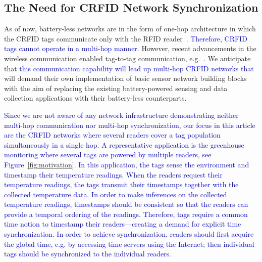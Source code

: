 \documentclass[10pt,journal,compsoc]{IEEEtran}
\newcommand{\add}[1]{\textcolor{blue}{#1}}
\begin{document}
\subsection{The Need for CRFID Network Synchronization}

As of now, battery-less networks are in the form of one-hop architecture in which the CRFID tags communicate only with the RFID reader~\cite{wisp,booksmith2013,wisent:2016}. \add{Therefore, CRFID tags cannot operate in a multi-hop manner.} However, recent advancements in the wireless communication enabled tag-to-tag communication, e.g.~\cite{liu2013ambient}.  We anticipate that \add{this communication capability will lead up multi-hop CRFID networks that} will demand their own implementation of basic sensor network building blocks~\cite{levis:tinyos} with the aim of replacing the existing battery-powered sensing and data collection applications with their battery-less counterparts. 

\add{Since we are not aware of any network infrastructure demonstrating neither multi-hop communication nor multi-hop synchronization, our focus in this article are the CRFID networks where several readers cover a tag population simultaneously in a single hop. A representative application is the greenhouse monitoring where several tags are powered by multiple readers, see Figure~\ref{fig:motivation}. In this application, the tags sense the environment and timestamp their temperature readings. When the readers request their temperature readings, the tags transmit their timestamps together with the collected temperature data. In order to make inferences on the collected temperature readings, timestamps should be consistent so that the readers can provide a temporal ordering of the readings. Therefore, tags require a common time notion to timestamp their readers---creating a demand for explicit time synchronization. In order to achieve synchronization, readers should first acquire the global time, e.g. by accessing time servers using the Internet; then individual tags should be synchronized to the individual readers.}

\end{document}
